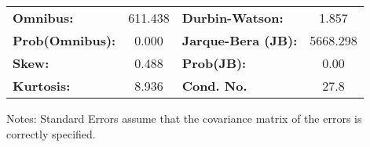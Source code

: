\begin{center}
\begin{tabular}{lcccccc}
\bottomrule
\end{tabular}
\begin{tabular}{lclc}
\textbf{Omnibus:}       & 611.438 & \textbf{  Durbin-Watson:     } &    1.857  \\
\textbf{Prob(Omnibus):} &   0.000 & \textbf{  Jarque-Bera (JB):  } & 5668.298  \\
\textbf{Skew:}          &   0.488 & \textbf{  Prob(JB):          } &     0.00  \\
\textbf{Kurtosis:}      &   8.936 & \textbf{  Cond. No.          } &     27.8  \\
\bottomrule
\end{tabular}
\end{center}

Notes: \newline
 [1] Standard Errors assume that the covariance matrix of the errors is correctly specified.